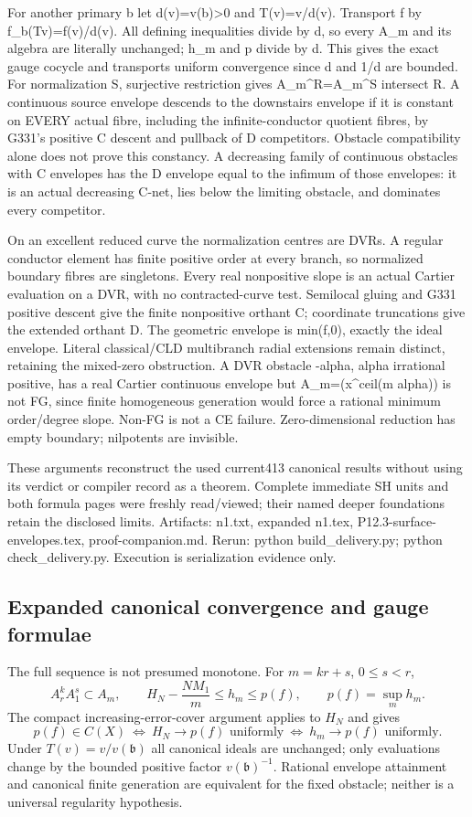 For another primary b let d(v)=v(b)>0 and T(v)=v/d(v). Transport f by f\_b(Tv)=f(v)/d(v). All defining inequalities divide by d, so every A\_m and its algebra are literally unchanged; h\_m and p divide by d. This gives the exact gauge cocycle and transports uniform convergence since d and 1/d are bounded. For normalization S, surjective restriction gives A\_m\textasciicircum{}R=A\_m\textasciicircum{}S intersect R. A continuous source envelope descends to the downstairs envelope if it is constant on EVERY actual fibre, including the infinite-conductor quotient fibres, by G331's positive C descent and pullback of D competitors. Obstacle compatibility alone does not prove this constancy. A decreasing family of continuous obstacles with C envelopes has the D envelope equal to the infimum of those envelopes: it is an actual decreasing C-net, lies below the limiting obstacle, and dominates every competitor.

On an excellent reduced curve the normalization centres are DVRs. A regular conductor element has finite positive order at every branch, so normalized boundary fibres are singletons. Every real nonpositive slope is an actual Cartier evaluation on a DVR, with no contracted-curve test. Semilocal gluing and G331 positive descent give the finite nonpositive orthant C; coordinate truncations give the extended orthant D. The geometric envelope is min(f,0), exactly the ideal envelope. Literal classical/CLD multibranch radial extensions remain distinct, retaining the mixed-zero obstruction. A DVR obstacle -alpha, alpha irrational positive, has a real Cartier continuous envelope but A\_m=(x\textasciicircum{}ceil(m alpha)) is not FG, since finite homogeneous generation would force a rational minimum order/degree slope. Non-FG is not a CE failure. Zero-dimensional reduction has empty boundary; nilpotents are invisible.

These arguments reconstruct the used current413 canonical results without using its verdict or compiler record as a theorem. Complete immediate SH units and both formula pages were freshly read/viewed; their named deeper foundations retain the disclosed limits. Artifacts: n1.txt, expanded n1.tex, P12.3-surface-envelopes.tex, proof-companion.md. Rerun: python build\_delivery.py; python check\_delivery.py. Execution is serialization evidence only.

\subsection*{Expanded canonical convergence and gauge formulae}
The full sequence is not presumed monotone. For $m=kr+s$, $0\le s<r$,
\[
 A_r^k A_1^s\subset A_m,\qquad
 H_N-\frac{NM_1}{m}\le h_m\le p(f),\qquad
 p(f)=\sup_m h_m.
\]
The compact increasing-error-cover argument applies to $H_N$ and gives
\[
 p(f)\in C(X)\ \Longleftrightarrow\ H_N\to p(f)\text{ uniformly}
 \ \Longleftrightarrow\ h_m\to p(f)\text{ uniformly}.
\]
Under $T(v)=v/v(\mathfrak b)$ all canonical ideals are unchanged;
only evaluations change by the bounded positive factor $v(\mathfrak b)^{-1}$.
Rational envelope attainment and canonical finite generation are equivalent
for the fixed obstacle; neither is a universal regularity hypothesis.
